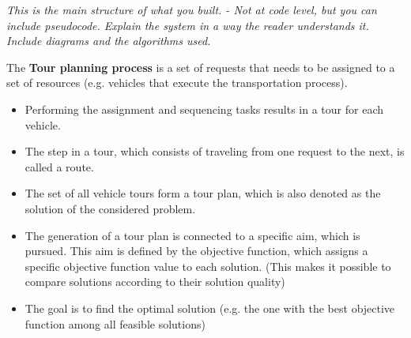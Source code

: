 \textit{This is the main structure of what you built.
- Not at code level, but you can include pseudocode.
Explain the system in a way the reader understands it.
Include diagrams and the algorithms used.}

\par
The \textbf{Tour planning process} is a set of requests that needs to be assigned to a set of resources (e.g. vehicles that execute the transportation process). 
\begin{itemize}
\item Performing the assignment and sequencing tasks results in a tour for each vehicle.  
\item The step in a tour, which consists of traveling from one request to the next, is called a route.
\item The set of all vehicle tours form a tour plan, which is also denoted as the solution of the considered problem. 
\item The generation of a tour plan is connected to a specific aim, which is pursued. This aim is defined by the objective function, which assigns a specific objective function value to each solution. (This makes it possible to compare solutions according to their solution quality)
\item The goal is to find the optimal solution (e.g. the one with the best objective function among all feasible solutions) 
\end{itemize}
\citep{vehiclerouting}

